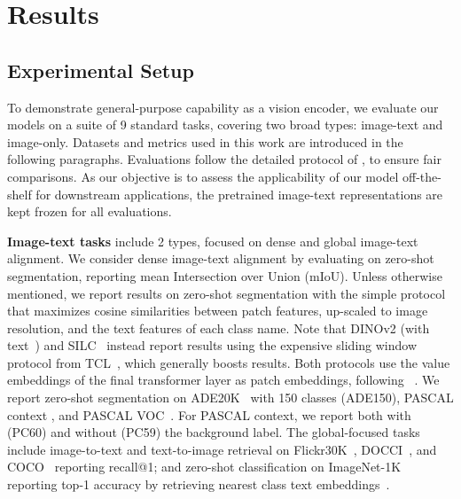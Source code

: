 \section{Results}
\label{results}
\subsection{Experimental Setup}



To demonstrate general-purpose capability as a vision encoder, we evaluate our models on a suite of 9 standard tasks, covering two broad types: image-text and image-only.
Datasets and metrics used in this work are introduced in the following paragraphs.
Evaluations follow the detailed protocol of \citep{tips_paper}, to ensure fair comparisons.
As our objective is to assess the applicability of our model off-the-shelf for downstream applications, the pretrained image-text representations are kept frozen for all evaluations.

\noindent\textbf{Image-text tasks} include 2 types, focused on dense and global image-text alignment.
We consider dense image-text alignment by evaluating on zero-shot segmentation, reporting mean Intersection over Union (mIoU).
Unless otherwise mentioned, we report \tipsvtwo results on zero-shot segmentation with the simple protocol that maximizes cosine similarities between patch features, up-scaled to image resolution, and the text features of each class name.
Note that DINOv2 (with text~\cite{jose2024dinov2}) and SILC~\cite{naeem2024silc} instead report results using the expensive sliding window protocol from TCL~\citep{cha2023learning}, which generally boosts results.
Both protocols use the value embeddings of the final transformer layer as patch embeddings, following ~\citep{zhou2022extract}.
We report zero-shot segmentation on ADE20K~\citep{zhou2017ade20k} with 150 classes (ADE150), PASCAL context \citep{everingham2011pascal}, and PASCAL VOC~\citep{everingham2010pascal}.
For PASCAL context, we report both with (PC60) and without (PC59) the background label.
The global-focused tasks include image-to-text and text-to-image retrieval on Flickr30K~\citep{young2014from}, DOCCI~\citep{onoe2024docci}, and COCO~\citep{chen2015cococaptions} reporting recall@1; and zero-shot classification on ImageNet-1K reporting top-1 accuracy by retrieving nearest class text embeddings~\citep{radford2021clip}. 


